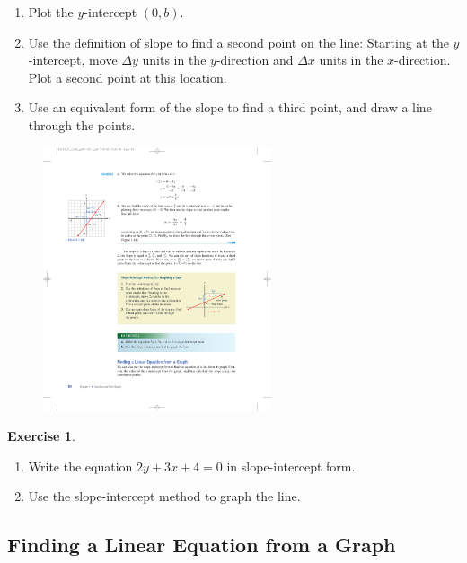 \documentclass[10pt,]{book}
\theoremstyle{plain}
\theoremstyle{definition}
\theoremstyle{definition}
\theoremstyle{definition}
\theoremstyle{definition}
\theoremstyle{definition}
\newtheorem{exercise}[theorem]{Exercise}
\numberwithin{equation}{section}
\begin{document}
\leavevmode%
\begin{enumerate}[label=*\alph**]
\item\hypertarget{li-166}{}Plot the \(y\)-intercept \((0, b)\).\item\hypertarget{li-167}{}Use the definition of slope to find a second point on the line: Starting at the \(y\)-intercept, move \(\Delta y\) units in the \(y\)-direction and \(\Delta x\) units in the \(x\)-direction. Plot a second point at this location.\item\hypertarget{li-168}{}Use an equivalent form of the slope to find a third point, and draw a line through the points.\end{enumerate}
%
\leavevmode%
\begin{figure}
\centering
\includegraphics[width=0.60\textwidth,]{images/fig-slope-intercept0.pdf}\caption{\label{fig-slope-intercept0}}
\end{figure}
\begin{exercise}\label{exercise-slope-intercept}
\leavevmode%
\begin{enumerate}[label=*\alph**]
\item\hypertarget{li-169}{}Write the equation \(2y + 3x + 4 = 0\) in slope-intercept form.\item\hypertarget{li-170}{}Use the slope-intercept method to graph the line.\end{enumerate}
\end{exercise}
\typeout{************************************************}
\typeout{************************************************}
\subsection[Finding a Linear Equation from a Graph]{Finding a Linear Equation from a Graph}\label{subsection-26}
\end{document}
